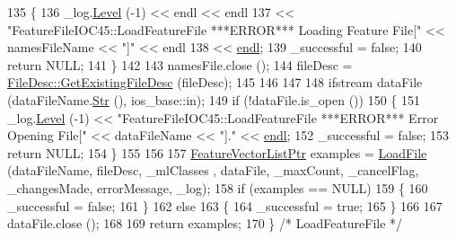 \begin{DoxyCode}
135   \{
136     \_log.\hyperlink{class_k_k_b_1_1_run_log_a32cf761d7f2e747465fd80533fdbb659}{Level} (-1) << endl << endl 
137                    << \textcolor{stringliteral}{"FeatureFileIOC45::LoadFeatureFile    ***ERROR***     Loading Feature File["} << 
      namesFileName << \textcolor{stringliteral}{"]"} << endl
138                    << \hyperlink{namespace_k_k_b_ad1f50f65af6adc8fa9e6f62d007818a8}{endl};
139     \_successful = \textcolor{keyword}{false};
140     \textcolor{keywordflow}{return} NULL;
141   \}
142 
143   namesFile.close ();
144   fileDesc = \hyperlink{class_k_k_m_l_l_1_1_file_desc_ab64013b479502d2761a9f11570a565bc}{FileDesc::GetExistingFileDesc} (fileDesc);
145 
146 
147 
148   ifstream  dataFile (dataFileName.\hyperlink{class_k_k_b_1_1_k_k_str_ad574e6c0fe7f6ce1ba3ab0a8ce2fbd52}{Str} (), ios\_base::in);
149   \textcolor{keywordflow}{if}  (!dataFile.is\_open ())
150   \{
151     \_log.\hyperlink{class_k_k_b_1_1_run_log_a32cf761d7f2e747465fd80533fdbb659}{Level} (-1) << \textcolor{stringliteral}{"FeatureFileIOC45::LoadFeatureFile   ***ERROR***      Error Opening File["} << 
      dataFileName << \textcolor{stringliteral}{"]."} << \hyperlink{namespace_k_k_b_ad1f50f65af6adc8fa9e6f62d007818a8}{endl};
152     \_successful = \textcolor{keyword}{false};
153     \textcolor{keywordflow}{return}  NULL;
154   \}
155 
156 
157   \hyperlink{class_k_k_m_l_l_1_1_feature_vector_list}{FeatureVectorListPtr}  examples = \hyperlink{class_k_k_m_l_l_1_1_feature_file_i_o_c45_a50c64295fe00ad20996b39665e5f1305}{LoadFile} (dataFileName, fileDesc, \_mlClasses
      , dataFile, \_maxCount, \_cancelFlag, \_changesMade, errorMessage, \_log);
158   \textcolor{keywordflow}{if}  (examples == NULL)
159   \{
160     \_successful = \textcolor{keyword}{false};
161   \}
162   \textcolor{keywordflow}{else}
163   \{
164     \_successful = \textcolor{keyword}{true};
165   \}
166 
167   dataFile.close ();
168 
169   \textcolor{keywordflow}{return}  examples;
170 \}  \textcolor{comment}{/* LoadFeatureFile */}
\end{DoxyCode}
